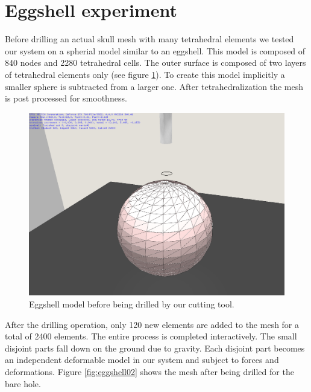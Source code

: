 \section{Eggshell experiment}
Before drilling an actual skull mesh with many tetrahedral elements we tested our system on a spherial model similar to 
an eggshell. This model is composed of 840 nodes and 2280 tetrahedral cells. The outer surface is composed of two layers 
of tetrahedral elements only (see figure \ref{fig:eggshell01}). To create this model implicitly a smaller sphere is subtracted 
from a larger one. After tetrahedralization the mesh is post processed for smoothness.

\begin{figure}[H]
  \centering
  \includegraphics[width=0.7\linewidth]{figures/evaluation/eggshell01.png}
  \caption{\label{fig:eggshell01}
  {Eggshell model before being drilled by our cutting tool.}
}
\end{figure}

After the drilling operation, only 120 new elements are added to the mesh for a total of 2400 elements. The entire process is completed 
interactively. The small disjoint parts fall down on the ground due to gravity. Each disjoint part becomes an independent
deformable model in our system and subject to forces and deformations. Figure \ref{fig:eggshell02} shows the mesh after being 
drilled for the bare hole.


